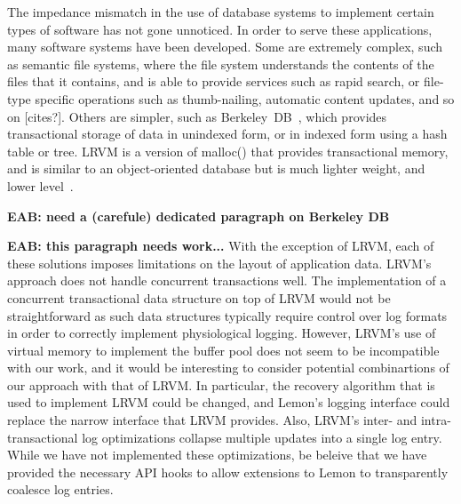 \documentclass[letterpaper,twocolumn,english]{article}
\newcommand{\yad}{Lemon\xspace}
\newcommand{\eab}[1]{{\bf EAB: #1}}
\begin{document}
The impedance mismatch in the use of database systems to implement
certain types of software has not gone unnoticed.
%
%
%
In
order to serve these applications, many software systems have been 
developed.  Some are extremely complex, such as semantic file
systems, where the file system understands the contents of the files
that it contains, and is able to provide services such as rapid
search, or file-type specific operations such as thumb-nailing,
automatic content updates, and so on [cites?].  Others are simpler, such as
Berkeley~DB~\cite{berkeleyDB, bdb}, which provides transactional
storage of data in unindexed form, or in indexed form using a hash
table or tree.  LRVM is a version of malloc() that provides
transactional memory, and is similar to an object-oriented database
but is much lighter weight, and lower level~\cite{lrvm}.  

\eab{need a (carefule) dedicated paragraph on Berkeley DB}

\eab{this paragraph needs work...}
With the 
exception of LRVM, each of these solutions imposes limitations on the 
layout of application data.  LRVM's approach does not handle concurrent
transactions well.  The implementation of a concurrent transactional
data structure on top of LRVM would not be straightforward as such
data structures typically require control over log formats in order 
to correctly implement physiological logging.  
However, LRVM's use of virtual memory to implement the buffer pool 
does not seem to be incompatible with our work, and it would be 
interesting to consider potential combinartions of our approach 
with that of LRVM.  In particular, the recovery algorithm that is used to 
implement LRVM could be changed, and \yad's logging interface could 
replace the narrow interface that LRVM provides.  Also, LRVM's inter- 
and intra-transactional log optimizations collapse multiple updates 
into a single log entry.  While we have not implemented these 
optimizations, be beleive that we have provided the necessary API hooks 
to allow extensions to \yad to transparently coalesce log entries.
\end{document}
